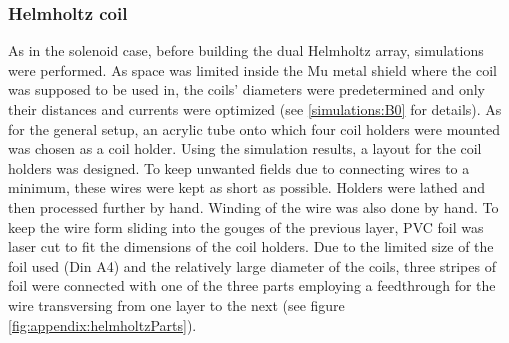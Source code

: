         \subsubsection{Helmholtz coil}
        \label{sec:matMeth:Helmholtz}
        As in the solenoid case, before building the dual Helmholtz array, simulations were performed.  As space was limited inside the Mu metal shield where the coil was supposed to be used in, the coils' diameters were predetermined and only their distances and currents were optimized (see \ref{simulations:B0} for details). As for the general setup, an acrylic tube onto which four coil holders were mounted was chosen as a coil holder. Using the simulation results, a layout for the coil holders was designed. To keep unwanted fields due to connecting wires to a minimum, these wires were kept as short as possible. Holders were lathed and then processed further by hand. Winding of the wire was also done by hand. To keep the wire form sliding into the gouges of the previous layer, PVC foil was laser cut to fit the dimensions of the coil holders. Due to the limited size of the foil used (Din A4) and the relatively large diameter of the coils, three stripes of foil were connected with one of the three parts employing a feedthrough for the wire transversing from one layer to the next (see figure \ref{fig:appendix:helmholtzParts}).
